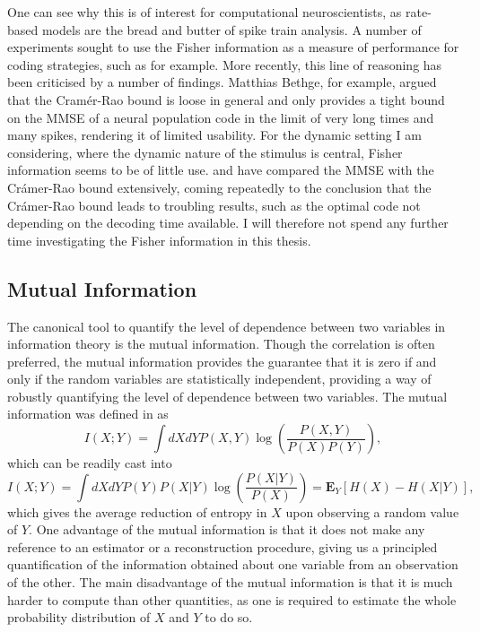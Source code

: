 \par
One can see why this is of interest for
computational neuroscientists, as rate-based models are the bread and butter of spike train analysis. A number of experiments sought to use the Fisher information
as a measure of performance for coding strategies, such as  for example. More recently, this line of reasoning has been criticised
by a number of findings. Matthias Bethge, for example, argued that the Cram\'{e}r-Rao bound is loose in general and only provides a tight bound on the MMSE of a
neural population code in the limit of very long times and many spikes, rendering it of limited usability. For the dynamic setting I am considering,
where the dynamic nature of the stimulus is central, Fisher information seems to be of little use.  and  have compared the MMSE with
the Cr\'{a}mer-Rao bound extensively, coming repeatedly to the conclusion that the Cr\'{a}mer-Rao bound leads to troubling results, such as the optimal
code not depending on the decoding time available. I will therefore not spend any further time investigating the Fisher information in this thesis.

\subsection{Mutual Information}
\label{sec:mutual_info}

The canonical tool to quantify the level of dependence between two variables in information theory is the mutual information. Though the correlation is often 
preferred, the mutual information provides the guarantee that it is zero if and only if the random variables are statistically independent, providing a way of robustly quantifying the level 
of dependence between two variables. The mutual information was defined in  as
\[
I(X;Y) = \int dX dY P(X,Y) \log \left(\frac{P(X,Y)}{P(X)P(Y)} \right),
\]
which can be readily cast into
\[
I(X;Y) = \int dX dY P(Y) P(X|Y) \log \left(\frac{P(X|Y)}{P(X)} \right) = \boldsymbol{E}_Y \left[H(X) - H(X|Y)\right],
\]
which gives the average reduction of entropy in $X$ upon observing a random value of $Y$.  One advantage of the mutual information is that it does not make
any reference to an estimator or a reconstruction procedure, giving us a principled quantification of the information obtained about one variable from an observation
of the other. The main disadvantage of the mutual information is that it is much harder to compute than other quantities, as one is required to estimate the whole
probability distribution of $X$ and $Y$ to do so.\par

